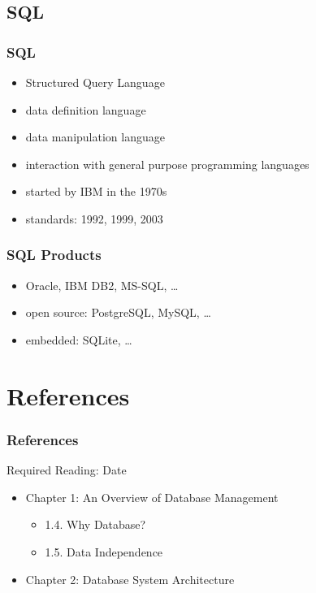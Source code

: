 \documentclass[dvipsnames]{beamer}
\theoremstyle{plain}
\begin{document}
\subsection{SQL}

\begin{frame}
  \frametitle{SQL}

  \begin{itemize}
    \item \alert{Structured Query Language}
    \item data definition language
    \item data manipulation language
    \item interaction with general purpose programming languages

    \bigskip
    \item started by IBM in the 1970s
    \item standards: 1992, 1999, 2003
  \end{itemize}
\end{frame}

\begin{frame}
  \frametitle{SQL Products}

  \begin{itemize}
    \item Oracle, IBM DB2, MS-SQL, \ldots
    \item open source: PostgreSQL, MySQL, \ldots
    \item embedded: SQLite, \ldots
  \end{itemize}
\end{frame}

\section*{References}

\begin{frame}
  \frametitle{References}

  \begin{block}{Required Reading: Date}
    \begin{itemize}
      \item Chapter 1: An Overview of Database Management
      \begin{itemize}
        \item 1.4. \alert{Why Database?}
        \item 1.5. \alert{Data Independence}
      \end{itemize}

      \item Chapter 2: \alert{Database System Architecture}
    \end{itemize}
  \end{block}
\end{frame}
\end{document}
